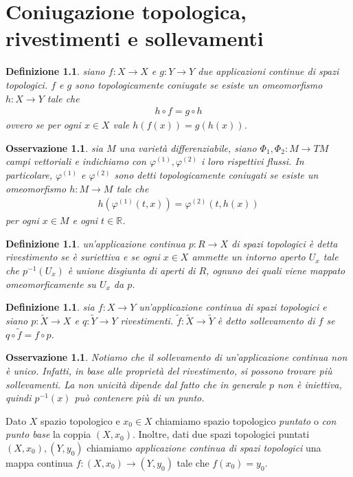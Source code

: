 \documentclass[twoside, 11pt]{amsbook}
\newcommand{\0}{{(0)}}
\newcommand{\3}{{(3)}}
\theoremstyle{colonplain}
\theoremstyle{colondefinition}
\newtheorem{defn}[thm]{Definizione}
\theoremstyle{colonremark}
\newtheorem{rmk}[thm]{Osservazione}
\numberwithin{equation}{chapter}
\begin{document}
\chapter{Coniugazione topologica, rivestimenti e sollevamenti}
\begin{defn}\label{TopConjDefn} siano $f : X \longrightarrow X$ e $g : Y \longrightarrow Y$ due applicazioni continue di spazi topologici. $f$ e $g$ sono \textit{topologicamente coniugate} se esiste un omeomorfismo $h : X \longrightarrow Y$ tale che
\begin{align}
    h \circ f = g \circ h 
\end{align}
ovvero se per ogni $x \in X$ vale $h(f(x)) = g(h(x))$.
\end{defn}
\begin{rmk} sia $M$ una varietà differenziabile, siano $\Phi_1, \Phi_2 : M \longrightarrow TM$ campi vettoriali e indichiamo con $\varphi^{(1)}, \varphi^{(2)}$ i loro rispettivi flussi. In particolare, $\varphi^{(1)}$ e $\varphi^{(2)}$ sono detti topologicamente coniugati se esiste un omeomorfismo $h : M \longrightarrow M$ tale che
\begin{align}
    h(\varphi^{(1)}(t, x)) = \varphi^{(2)}(t, h(x)) 
\end{align}
per ogni $x \in M$ e ogni $t \in \mathbb{R}$.
\end{rmk}
\begin{defn} un'applicazione continua $p : R \longrightarrow X$ di spazi topologici è detta \textit{rivestimento} se è suriettiva e se ogni $x \in X$ ammette un intorno aperto $U_x$ tale che $p^{-1}(U_x)$ è unione disgiunta di aperti di $R$, ognuno dei quali viene mappato omeomorficamente su $U_x$ da $p$.
\end{defn}
\begin{defn} sia $f : X \longrightarrow Y$ un'applicazione continua di spazi topologici e siano
$p : \tilde{X} \longrightarrow X$ e $q : \tilde{Y} \longrightarrow Y$ rivestimenti. $\tilde{f} : \tilde{X} \longrightarrow \tilde{Y}$ è detto \textit{sollevamento} di $f$ se $q \circ \tilde{f} = f \circ p$.
\end{defn}
\begin{rmk} Notiamo che il sollevamento di un'applicazione continua non è unico. Infatti, in base alle proprietà del rivestimento, si possono trovare più sollevamenti. La non unicità dipende dal fatto che in generale $p$ non è iniettiva, quindi $p^{-1}(x)$ può contenere più di un punto.
\end{rmk}
Dato $X$ spazio topologico e $x_0 \in X$ chiamiamo spazio topologico \textit{puntato} o \textit{con punto base} la coppia $(X, x_0)$. Inoltre, dati due spazi topologici puntati $(X, x_0), (Y, y_0)$ chiamiamo \textit{applicazione continua di spazi topologici} una mappa continua $f : (X, x_0) \longrightarrow (Y, y_0)$ tale che $f(x_0) = y_0$. \\ \\
\end{document}
